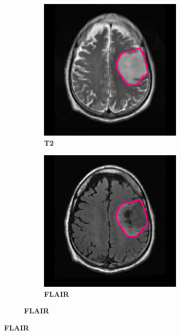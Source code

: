 \begin{subappendices}
\begin{figure}[htbp]
\begin{subfigure}[b]{0.8\textwidth}
\begin{subfigure}[b]{0.215\textwidth}
        \end{subfigure}
        \hfill
        \begin{subfigure}[b]{0.215\textwidth}
        \caption*{\normalfont \textbf{\acrshort{T2}}\nopunct}
        \includegraphics[width=\textwidth, clip, trim=2.5cm 0.5cm 2.5cm 0.5cm]{Figures/Random_segs/T2_TCGA-DU-7301.png}
        \end{subfigure}
        \hfill
        \begin{subfigure}[b]{0.215\textwidth}
        \caption*{\normalfont \textbf{\acrshort{FLAIR}}\nopunct}
        \includegraphics[width=\textwidth, clip, trim=2.5cm 0.5cm 2.5cm 0.5cm]{Figures/Random_segs/FLAIR_TCGA-DU-7301.png}

\end{subfigure}
\end{subfigure}
\end{figure}
\end{subappendices}
